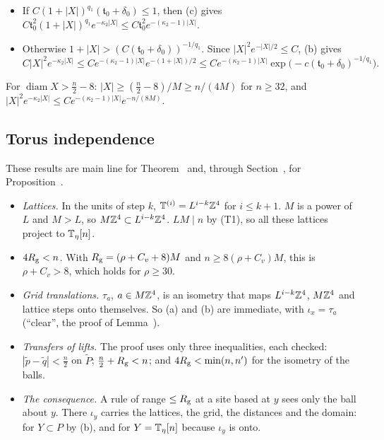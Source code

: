 \begin{detail}
\begin{step}[(d)]
\begin{itemize}
\item If $C(1+|X|)^{q_1}(\mathfrak t_0+\delta_0)\le1$, then (c) gives $C\mathfrak t_0^2(1+|X|)^{q_1}e^{-\kappa_2|X|}\le C\mathfrak t_0^2e^{-(\kappa_2-1)|X|}$.
\item Otherwise $1+|X|>(C(\mathfrak t_0+\delta_0))^{-1/q_1}$. Since $|X|^2e^{-|X|/2}\le C$, (b) gives
\[
C|X|^2e^{-\kappa_2|X|}\le Ce^{-(\kappa_2-1)|X|}e^{-(1+|X|)/2}\le Ce^{-(\kappa_2-1)|X|}\exp\big(-c(\mathfrak t_0+\delta_0)^{-1/q_1}\big).
\]
\end{itemize}
For $\operatorname{diam}X>\frac n2-8$: $|X|\ge(\frac n2-8)/M\ge n/(4M)$ for $n\ge32$, and $|X|^2e^{-\kappa_2|X|}\le Ce^{-(\kappa_2-1)|X|}e^{-n/(8M)}$.
\end{step}
\end{detail}

\subsection{Torus independence}\label{d9:torus}

These results are main line for Theorem~ and, through Section~, for Proposition~.

\begin{detail}\label{d9:torus-setting}
\begin{itemize}
\item \emph{Lattices.} In the units of step $k$, $\mathbb T^{(i)}=L^{i-k}\mathbb Z^4$ for $i\le k+1$. $M$ is a power of $L$ and $M>L$, so $M\mathbb Z^4\subset L^{i-k}\mathbb Z^4$. $LM\mid n$ by (T1), so all these lattices project to $\mathbb T_\eta[n]$.
\item \emph{$4R_{\rm g}<n$.} With $R_{\rm g}=(\rho+C_v+8)M$ and $n\ge8(\rho+C_v)M$, this is $\rho+C_v>8$, which holds for $\rho\ge30$.
\item \emph{Grid translations.} $\tau_a$, $a\in M\mathbb Z^4$, is an isometry that maps $L^{i-k}\mathbb Z^4$, $M\mathbb Z^4$ and lattice steps onto themselves. So (a) and (b) are immediate, with $\iota_x=\tau_a$ (``clear'', the proof of Lemma~).
\item \emph{Transfers of lifts.} The proof uses only three inequalities, each checked: $|\tilde p-\tilde q|<\frac n2$ on $\tilde P$; $\frac n2+R_{\rm g}<n$; and $4R_{\rm g}<\min(n,n')$ for the isometry of the balls.
\item \emph{The consequence.} A rule of range $\le R_{\rm g}$ at a site based at $y$ sees only the ball about $y$. There $\iota_y$ carries the lattices, the grid, the distances and the domain: for $Y\subset P$ by (b), and for $Y=\mathbb T_\eta[n]$ because $\iota_y$ is onto.
\end{itemize}
\end{detail}

